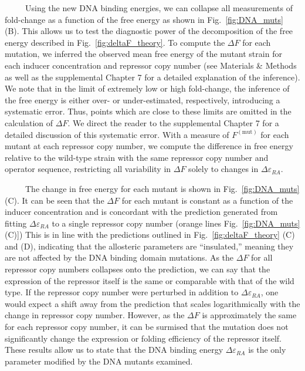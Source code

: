 \documentclass[12pt]{caltech_thesis}
\begin{document}
~~~~~Using the new DNA binding energies, we can collapse all
measurements of fold-change as a function of the free energy as shown in
Fig.~\ref{fig:DNA_muts} (B). This allows us to test the diagnostic power
of the decomposition of the free energy described in
Fig.~\ref{fig:deltaF_theory}. To compute the \(\Delta F\) for each
mutation, we inferred the observed mean free energy of the mutant strain
for each inducer concentration and repressor copy number (see Materials
\& Methods as well as the supplemental Chapter 7 for a detailed
explanation of the inference). We note that in the limit of extremely
low or high fold-change, the inference of the free energy is either
over- or under-estimated, respectively, introducing a systematic error.
Thus, points which are close to these limits are omitted in the
calculation of \(\Delta F\). We direct the reader to the supplemental
Chapter 7 for a detailed discussion of this systematic error. With a
measure of \(F^\mathrm{(mut)}\) for each mutant at each repressor copy
number, we compute the difference in free energy relative to the
wild-type strain with the same repressor copy number and operator
sequence, restricting all variability in \(\Delta F\) solely to changes
in \(\Delta\varepsilon_{RA}\).

~~~~~The change in free energy for each mutant is shown in
Fig.~\ref{fig:DNA_muts} (C). It can be seen that the \(\Delta F\) for
each mutant is constant as a function of the inducer concentration and
is concordant with the prediction generated from fitting
\(\Delta\varepsilon_{RA}\) to a single repressor copy number (orange
lines Fig.~\ref{fig:DNA_muts} (C){]}) This is in line with the
predictions outlined in Fig.~\ref{fig:deltaF_theory} (C) and (D),
indicating that the allosteric parameters are ``insulated,'' meaning
they are not affected by the DNA binding domain mutations. As the
\(\Delta F\) for all repressor copy numbers collapses onto the
prediction, we can say that the expression of the repressor itself is
the same or comparable with that of the wild type. If the repressor copy
number were perturbed in addition to \(\Delta \varepsilon_{RA}\), one
would expect a shift away from the prediction that scales
logarithmically with the change in repressor copy number. However, as
the \(\Delta F\) is approximately the same for each repressor copy
number, it can be surmised that the mutation does not significantly
change the expression or folding efficiency of the repressor itself.
These results allow us to state that the DNA binding energy
\(\Delta\varepsilon_{RA}\) is the only parameter modified by the DNA
mutants examined.
\end{document}
